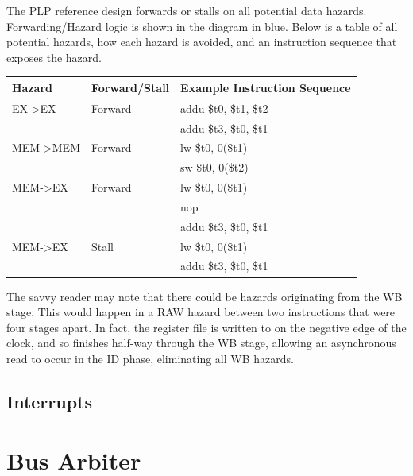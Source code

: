 \documentclass{article}
\begin{document}
The PLP reference design forwards or stalls on all potential data hazards. Forwarding/Hazard logic is shown in the diagram in blue. Below is a table of all potential hazards, how each hazard is avoided, and an instruction sequence that exposes the hazard.

\begin{tabular}{|l | l | l |}
 \hline

 \textbf{Hazard} &	\textbf{Forward/Stall} & \textbf{Example Instruction Sequence} \\ \hline
 EX-\textgreater EX   &  Forward & addu \$t0, \$t1, \$t2                           \\
  					  & 	     & addu  \$t3, \$t0, \$t1                          \\ \hline
 MEM-\textgreater MEM &	 Forward &	lw \$t0, 0(\$t1)                               \\ 
                      &          &  sw \$t0, 0(\$t2)                               \\ \hline
 MEM-\textgreater EX  &	 Forward &	lw \$t0, 0(\$t1)                               \\
                      &          &  nop                                            \\
                      &          &  addu \$t3, \$t0, \$t1                          \\ \hline
 MEM-\textgreater EX  &	 Stall   &	lw \$t0, 0(\$t1)                               \\ 
                      &          &  addu \$t3, \$t0, \$t1				           \\ \hline

\end{tabular}

The savvy reader may note that there could be hazards originating from the WB stage. This would happen in a RAW hazard between two instructions that were four stages apart. In fact, the register file is written to on the negative edge of the clock, and so finishes half-way through the WB stage, allowing an asynchronous read to occur in the ID phase, eliminating all WB hazards.

\subsection{Interrupts}

\section{Bus Arbiter}
\end{document}
